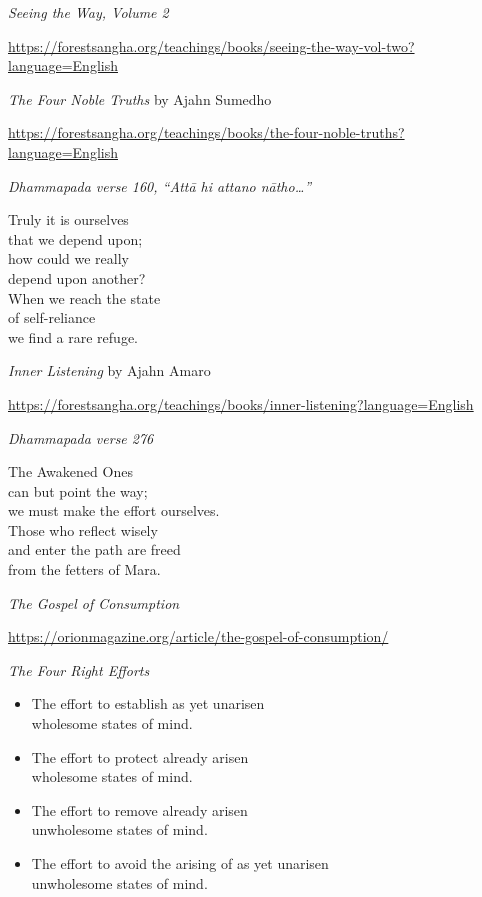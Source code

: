 \begin{thebibliography}{9}
 \emph{Seeing the Way, Volume 2}

  {\urlsize \url{https://forestsangha.org/teachings/books/seeing-the-way-vol-two?language=English}}

 \emph{The Four Noble Truths} by Ajahn Sumedho

  {\urlsize \url{https://forestsangha.org/teachings/books/the-four-noble-truths?language=English}}

 \emph{Dhammapada verse 160, ``Attā hi attano nātho\ldots{}''}

  Truly it is ourselves\\
  that we depend upon;\\
  how could we really\\
  depend upon another?\\
  When we reach the state\\
  of self-reliance\\
  we find a rare refuge.

 \emph{Inner Listening} by Ajahn Amaro

  {\urlsize \url{https://forestsangha.org/teachings/books/inner-listening?language=English}}

\clearpage

 \emph{Dhammapada verse 276}

  The Awakened Ones\\
  can but point the way;\\
  we must make the effort ourselves.\\
  Those who reflect wisely\\
  and enter the path are freed\\
  from the fetters of Mara.

 \emph{The Gospel of Consumption}

  {\urlsize \url{https://orionmagazine.org/article/the-gospel-of-consumption/}}

 \emph{The Four Right Efforts}

  \begin{itemize}
  \item The effort to establish as yet unarisen\\ wholesome states of mind.
  \item The effort to protect already arisen\\ wholesome states of mind.
  \item The effort to remove already arisen\\ unwholesome states of mind.
  \item The effort to avoid the arising of as yet unarisen\\ unwholesome states of mind.
  \end{itemize}


\end{thebibliography}
